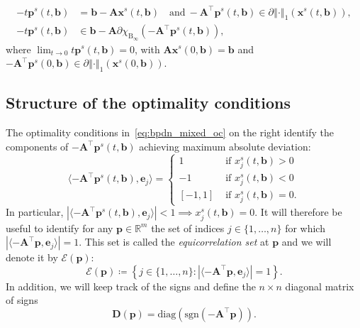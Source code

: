 \documentclass[11pt]{article}
\numberwithin{prop}{section}
\numberwithin{lem}{section}
\numberwithin{rem}{section}
\numberwithin{cor}{section}
\numberwithin{thm}{section}
\numberwithin{defn}{section}
\numberwithin{fact}{section}
\theoremstyle{plain}
\def\bb {\boldsymbol{b}}
\def\be {\boldsymbol{e}}
\def\bp {\boldsymbol{p}}
\def\bx {\boldsymbol{x}}
\def\R {\mathbb{R}}
\newcommand{\normone}[1]{\left\Vert{#1} \right\Vert_{1}}
\newcommand{\matr}[1]{\bm{#1}}
\def\sign {\mathrm{sgn}}
\def\diag {\mathrm{diag}}
\def\Binf {\mathrm{B}_{\infty}}
\def\Rm {\R^m}
\def\bxsol {\bx^{s}}
\def\bpsol {\bp^{s}}
\def\eqset {\mathcal{E}}
\def\Atop {\matr{A}^{\top}}
\begin{document}
\begin{subequations}\label{eq:bpdn_all_oc}
\begin{align}
-t\bpsol(t,\bb) &= \bb - \matr{A}\bxsol(t,\bb) \quad \text{and} \ -\matr{A}^{\top}\bpsol(t,\bb) \in \partial\normone{\cdot}(\bxsol(t,\bb)), \label{eq:bpdn_mixed_oc} \\
-t\bpsol(t,\bb) &\in  \bb - \matr{A}\partial\chi_{\Binf}(-\matr{A}^{\top}\bpsol(t,\bb)),\label{eq:lasso_dual_oc}
\end{align}
\end{subequations}
where $\lim_{t\to 0} t\bpsol(t,\bb) = 0$, with $\matr{A}\bxsol(0,\bb) = \bb$ and $-\matr{A}^{\top}\bp^{s}(0,\bb) \in \partial \normone{\cdot}(\bxsol(0,\bb))$.


\subsection{Structure of the optimality conditions}\label{subsec:reviewII}
The optimality conditions in~\eqref{eq:bpdn_mixed_oc} on the right identify the components of $-\matr{A}^{\top}\bpsol(t,\bb)$ achieving maximum absolute deviation:
\begin{equation}\label{eq:equicorrelation_char}
    \langle-\matr{A}^{\top}\bpsol(t,\bb),\be_{j}\rangle =
    \begin{cases}
    1\, &\, \text{if } x_{j}^{s}(t,\bb) > 0 \\
    -1\, &\, \text{if } x_{j}^{s}(t,\bb) < 0 \\
    [-1,1]\, &\, \text{if } x_{j}^{s}(t,\bb) = 0.
    \end{cases}
\end{equation}
In particular, $|\langle-\matr{A}^{\top}\bpsol(t,\bb),\be_{j}\rangle| < 1 \implies x_{j}^{s}(t,\bb) = 0$. It will therefore be useful to identify for any $\bp \in \Rm$ the set of indices $j \in \{1,\dots,n\}$ for which $|\langle-\matr{A}^{\top}\bp,\be_{j}\rangle| = 1$. This set is called the \emph{equicorrelation set} at $\bp$ and we will denote it by $\mathcal{E}(\bp)$:
\begin{equation}\label{eq:equicorrelation_set}
    \eqset(\bp) \coloneqq \left\{j \in \{1,\dots,n\} : |\langle-\matr{A}^{\top}\bp,\be_{j}\rangle| = 1 \right\}.
\end{equation}
In addition, we will keep track of the signs and define the $n \times n$ diagonal matrix of signs
\begin{equation}\label{eq:matrix_signs}
\matr{D}(\bp) = \diag\left(\sign{(-\Atop\bp)}\right).
\end{equation}
\end{document}
